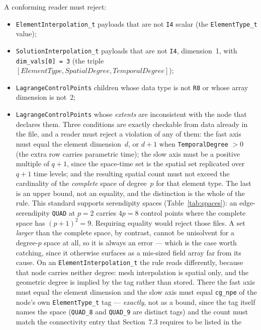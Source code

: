 \documentclass[11pt,letterpaper]{article}
\newif\ifvfourdraft
\newcommand{\vfour}[1]{\ifvfourdraft\textcolor{v4violet}{#1}\else#1\fi}
\newcommand{\vfourmark}{\ifvfourdraft\textcolor{v4violet}{\textbf{[v4]}}\ \fi}
\begin{document}
A conforming reader must reject:
\begin{itemize}
  \item \texttt{ElementInterpolation\_t} payloads that are not \texttt{I4} scalar (the
    \texttt{ElementType\_t} value);
  \item \texttt{SolutionInterpolation\_t} payloads that are not \texttt{I4}, dimension~1, with
    \texttt{dim\_vals[0] = 3} (the triple
    $[\textit{ElementType}, \textit{SpatialDegree}, \textit{TemporalDegree}]$);
  \item \texttt{LagrangeControlPoints} children whose data type is not \texttt{R8} or whose
    array dimension is not~2;
  \item \vfour{\texttt{LagrangeControlPoints} whose \emph{extents} are inconsistent
    with the node that declares them.  Three conditions are exactly checkable from
    data already in the file, and a reader must reject a violation of any of them:
    the fast axis must equal the element dimension~$d$, or $d+1$ when
    \texttt{TemporalDegree} $>0$ (the extra row carries parametric time); the slow
    axis must be a positive multiple of $q+1$, since the space-time set is the
    spatial set replicated over $q+1$ time levels; and the resulting spatial count
    must not exceed the cardinality of the \emph{complete} space of degree~$p$ for
    that element type.
    The last is an upper bound, not an equality, and the distinction is the whole
    of the rule.  This standard supports serendipity spaces (Table~\ref{tab:spaces}):
    an edge-serendipity \texttt{QUAD} at $p=2$ carries $4p = 8$ control points where
    the complete space has $(p+1)^2 = 9$.  Requiring equality would reject those
    files.  A set \emph{larger} than the complete space, by contrast, cannot be
    unisolvent for a degree-$p$ space at all, so it is always an error --- which is
    the case worth catching, since it otherwise surfaces as a mis-sized field array
    far from its cause.
    \vfourmark On an \texttt{ElementInterpolation\_t} the rule reads differently,
    because that node carries neither degree: mesh interpolation is spatial only,
    and the geometric degree is implied by the tag rather than stored.  There the
    fast axis must equal the element dimension and the slow axis must equal
    \texttt{cg\_npe} of the node's own \texttt{ElementType\_t} tag ---
    \emph{exactly}, not as a bound, since the tag itself names the space
    (\texttt{QUAD\_8} and \texttt{QUAD\_9} are distinct tags) and the count must
    match the connectivity entry that Section~7.3 requires to be listed in the
}
\end{itemize}
\end{document}
